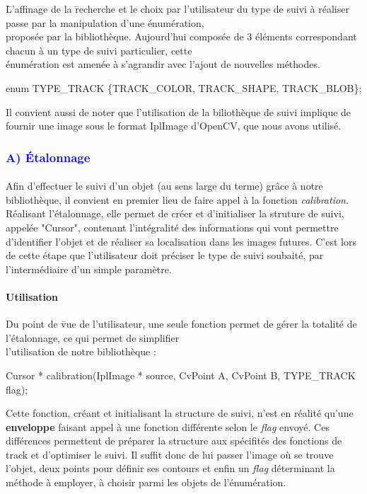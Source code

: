 \documentclass{report}
\begin{document}
				\begin{tabbing}
				\=L'affinage de la \=recherche et le choix par l'utilisateur du type de suivi à réaliser passe par la manipulation d'une énumération,\\ \>proposée par la bibliothèque. Aujourd'hui composée de 3 éléments correspondant chacun à un type de suivi particulier, cette\\ \>énumération est amenée à s'agrandir avec l'ajout de nouvelles méthodes. \\
				\>\>\begin{itshape}enum TYPE\_TRACK \{TRACK\_COLOR, TRACK\_SHAPE, TRACK\_BLOB\};\end{itshape}
				\end{tabbing}
				\quad 
				\quad Il convient aussi de noter que l'utilisation de la biliothèque de suivi implique de fournir une image sous le format IplImage d'OpenCV, que nous avons utilisé.
				\newpage
				\subsubsection{\textcolor{blue}{A) Étalonnage}} \paragraph{}
				Afin d'effectuer le suivi d'un objet (au sens large du terme) grâce à notre bibliothèque, il convient en premier lieu de faire appel à la fonction \textit{calibration}. Réalisant l'étalonnage, elle permet de créer et d'initialiser la struture de suivi, appelée "Cursor", contenant l'intégralité des informations qui vont permettre d'identifier l'objet et de réaliser sa localisation dans les images futures. C'est lors de cette étape que l'utilisateur doit préciser le type de suivi soubaité, par l'intermédiaire d'un simple paramètre.
					\paragraph{Utilisation}
					\begin{tabbing}
					\quad Du point de \=vue de l'utilisateur, une seule fonction permet de gérer la totalité de l'étalonnage, ce qui permet de simplifier\\ l'utilisation de notre bibliothèque : \\
					\>\begin{itshape}Cursor * calibration(IplImage * source, CvPoint A, CvPoint B, TYPE\_TRACK flag);\end{itshape}
					\end {tabbing}
					\quad Cette fonction, créant et initialisant la structure de suivi, n'est en réalité qu'une \textbf{enveloppe} faisant appel à une fonction différente selon le \textit{flag} envoyé. Ces différences permettent de préparer la structure aux spécifités des fonctions de track et d'optimiser le suivi. Il suffit donc de lui passer l'image où se trouve l'objet, deux points pour définir ses contours et enfin un \textit{flag} déterminant la méthode à employer, à choisir parmi les objets de l'énumération.
\end{document}
